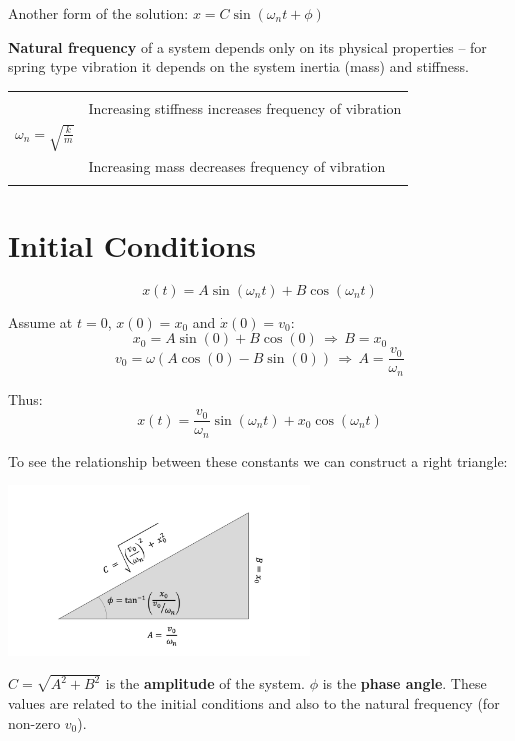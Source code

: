 \documentclass[12pt,letterpaper,twoside]{report}
\begin{document}
Another form of the solution:  $x = C \sin (\omega_n t + \phi)$

\textbf{Natural frequency} of a system depends only on its physical properties – for spring type vibration it depends on the system inertia (mass) and stiffness.

\begin{center}
\begin{tabu} to 1\textwidth {  | X[1, c]  | X[1, l] | }
\hline
& \\
& Increasing stiffness increases frequency of vibration\\
$\displaystyle \omega_n = \sqrt{\frac{k}{m}}$ & \\
& Increasing mass decreases frequency of vibration\\
& \\
\hline
\end{tabu}
\end{center}

\section{Initial Conditions}
\[
x(t) = A \sin (\omega_n t) + B \cos (\omega_n t)
\]

Assume at $t = 0$, $x(0) = x_0$ and $\dot{x}(0) = v_0$:
\[
x_0 = A \sin (0) + B \cos (0) \, \Rightarrow \, B = x_0
\]
\[
v_0 = \omega(A \cos (0) - B \sin (0)) \, \Rightarrow \, A = \frac{v_0}{\omega_n}
\]

Thus:
\[
x(t) = \frac{v_0}{\omega_n} \sin (\omega_n t) + x_0 \cos (\omega_n t)
\]

To see the relationship between these constants we can construct a right triangle:

\includegraphics[trim={2cm 0cm 2cm 1cm},clip,width=0.6\textwidth, center]{Slide76}

\vspace*{2\baselineskip}

$C = \sqrt{A^2 + B^2}$ is the \textbf{amplitude} of the system.  $\phi$ is the \textbf{phase angle}.  These values are related to the initial conditions and also to the natural frequency (for non-zero $v_0$).  
\end{document}
